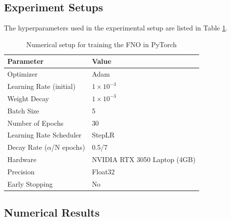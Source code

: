 \subsection{Experiment Setups}
%

The hyperparameters used in the experimental setup are listed in Table \ref{tab:training_setup_C}. 


\begin{table}[H]
	\centering
	\caption{Numerical setup for training the FNO in PyTorch}
	\label{tab:training_setup_C}
	\begin{tabular}{ll}
		\hline
		\textbf{Parameter} & \textbf{Value} \\
		\hline
		Optimizer           & Adam \\
		Learning Rate (initial)       & $1 \times 10^{-3}$ \\
		Weight Decay       & $1 \times 10^{-3}$ \\
		Batch Size          & 5 \\
		Number of Epochs    & 30 \\
		Learning Rate Scheduler & StepLR \\
		Decay Rate ($\alpha$/N epochs) &  0.5/7\\
		Hardware            & NVIDIA RTX 3050 Laptop (4GB) \\
		Precision           & Float32 \\
		Early Stopping      & No \\
		\hline
	\end{tabular}
\end{table}

\subsection{Numerical Results}

